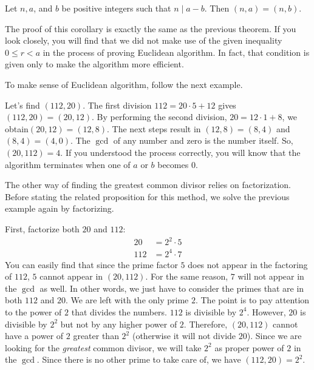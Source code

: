 \begin{corollary}
	Let $n, a$, and $b$ be positive integers such that $n\mid a-b$. Then $(n,a)=(n,b)$.
\end{corollary}

The proof of this corollary is exactly the same as the previous theorem. If you look closely, you will find that we did not make use of the given inequality $0 \leq r < a$ in the process of proving Euclidean algorithm. In fact, that condition is given only to make the algorithm more efficient.

To make sense of Euclidean algorithm, follow the next example.
\begin{example}
	Let's find $(112,20)$. The first division $112=20\cdot 5+12$ gives $(112,20)=(20,12)$. By performing the second division, $20=12\cdot1+8$, we obtain$(20,12)=(12,8)$. The next steps result in $(12,8)=(8,4)$ and $(8,4)=(4,0)$. The $\gcd$ of any number and zero is the number itself. So, $(20,112)=4$. If you understood the process correctly, you will know that the algorithm terminates when one of $a$ or $b$ becomes $0$.
\end{example}

The other way of finding the greatest common divisor relies on factorization. Before stating the related proposition for this method, we solve the previous example again by factorizing.

\begin{example}
	First, factorize both $20$ and $112$:
	\begin{align*}
		20  &= 2^2\cdot5\\
		112 &= 2^4\cdot7
	\end{align*}
	You can easily find that since the prime factor $5$ does not appear in the factoring of $112$, $5$ cannot appear in $(20,112)$. For the same reason, $7$ will not appear in the $\gcd$ as well. In other words, we just have to consider the primes that are in both $112$ and $20$. We are left with the only prime $2$. The point is to pay attention to the power of $2$ that divides the numbers. $112$ is divisible by $2^4$. However, $20$ is divisible by $2^2$ but not by any higher power of $2$. Therefore, $(20, 112)$ cannot have a power of $2$ greater than $2^2$ (otherwise it will not divide $20$). Since we are looking for the \textit{greatest} common divisor, we will take $2^2$ as proper power of $2$ in the $\gcd$. Since there is no other prime to take care of, we have $(112,20)=2^2$.
\end{example}

